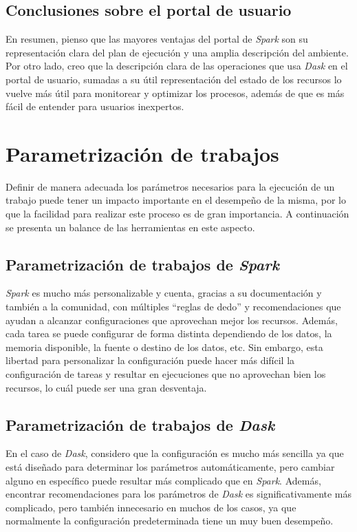 \subsection{Conclusiones sobre el portal de usuario}

En resumen, pienso que las mayores ventajas del portal de \textit{Spark} son su representación clara del plan de ejecución y una amplia descripción del ambiente. Por otro lado, creo que la descripción clara de las operaciones que usa \textit{Dask} en el portal de usuario, sumadas a su útil representación del estado de los recursos lo vuelve más útil para monitorear y optimizar los procesos, además de que es más fácil de entender para usuarios inexpertos.


\section{Parametrización de trabajos}

Definir de manera adecuada los parámetros necesarios para la ejecución de un trabajo puede tener un impacto importante en el desempeño de la misma, por lo que la facilidad para realizar este proceso es de gran importancia. A continuación se presenta un balance de las herramientas en este aspecto.

\subsection{Parametrización de trabajos de \textit{Spark}}

\textit{Spark} es mucho más personalizable y cuenta, gracias a su documentación y también a la comunidad, con múltiples ``reglas de dedo'' y recomendaciones que ayudan a alcanzar configuraciones que aprovechan mejor los recursos. Además, cada tarea se puede configurar de forma distinta dependiendo de los datos, la memoria disponible, la fuente o destino de los datos, etc. Sin embargo, esta libertad para personalizar la configuración puede hacer más difícil la configuración de tareas y resultar en ejecuciones que no aprovechan bien los recursos, lo cuál puede ser una gran desventaja.

\subsection{Parametrización de trabajos de \textit{Dask}}

En el caso de \textit{Dask}, considero que la configuración es mucho más sencilla ya que está diseñado para determinar los parámetros automáticamente, pero cambiar alguno en específico puede resultar más complicado que en \textit{Spark}. Además, encontrar recomendaciones para los parámetros de \textit{Dask} es significativamente más complicado, pero también innecesario en muchos de los casos, ya que normalmente la configuración predeterminada tiene un muy buen desempeño.

